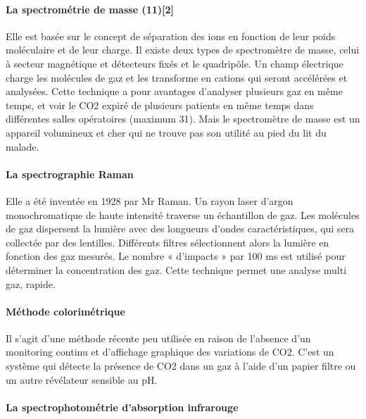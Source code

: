 \documentclass[12pt,]{article}
\let\oldparagraph\paragraph
\renewcommand{\paragraph}[1]{\oldparagraph{#1}\mbox{}}
\begin{document}
\paragraph{La spectrométrie de masse
(11){[}2{]}}\label{la-spectrometrie-de-masse-11bhavani1992capnometry}

Elle est basée sur le concept de séparation des ions en fonction de leur
poids moléculaire et de leur charge. Il existe deux types de
spectromètre de masse, celui à secteur magnétique et détecteurs fixés et
le quadripôle. Un champ électrique charge les molécules de gaz et les
transforme en cations qui seront accélérées et analysées. Cette
technique a pour avantages d'analyser plusieurs gaz en même temps, et
voir le CO2 expiré de plusieurs patients en même temps dans différentes
salles opératoires (maximum 31). Mais le spectromètre de masse est un
appareil volumineux et cher qui ne trouve pas son utilité au pied du lit
du malade.

\paragraph{La spectrographie Raman}\label{la-spectrographie-raman}

Elle a été inventée en 1928 par Mr Raman. Un rayon laser d'argon
monochromatique de haute intensité traverse un échantillon de gaz. Les
molécules de gaz dispersent la lumière avec des longueurs d'ondes
caractéristiques, qui sera collectée par des lentilles. Différents
filtres sélectionnent alors la lumière en fonction des gaz mesurés. Le
nombre « d'impacts » par 100 ms est utilisé pour déterminer la
concentration des gaz. Cette technique permet une analyse multi gaz,
rapide.

\paragraph{Méthode colorimétrique}\label{methode-colorimetrique}

Il s'agit d'une méthode récente peu utilisée en raison de l'absence d'un
monitoring continu et d'affichage graphique des variations de CO2. C'est
un système qui détecte la présence de CO2 dans un gaz à l'aide d'un
papier filtre ou un autre révélateur sensible au pH.

\paragraph{La spectrophotométrie d'absorption
infrarouge}\label{la-spectrophotometrie-dabsorption-infrarouge}
\end{document}
